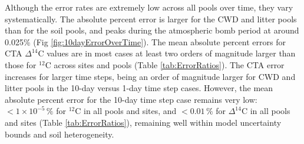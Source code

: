\documentclass[11pt,a4paper]{article}
\begin{document}
    

Although the error rates are extremely low across all pools over time, they vary systematically. The absolute percent error is larger for the CWD and litter pools than for the soil pools, and peaks during the atmospheric bomb period at around 0.025\%  (Fig \ref{fig:10dayErrorOverTime}). The mean absolute percent errors for CTA $\Delta^{14}$C values are in most cases at least two orders of magnitude larger than those for $^{12}$C across sites and pools (Table \ref{tab:ErrorRatios}). The CTA error increases for larger time steps, being an order of magnitude larger for CWD and litter pools in the 10-day versus 1-day time step cases. However, the mean absolute percent error for the 10-day time step case remains very low: $< 1 \times 10^{-5}\,\%$ for $^{12}$C in all pools and sites, and $<0.01\,\%$ for $\Delta^{14}$C in all pools and sites (Table \ref{tab:ErrorRatios}), remaining well within model uncertainty bounds and soil heterogeneity.
\end{document}

